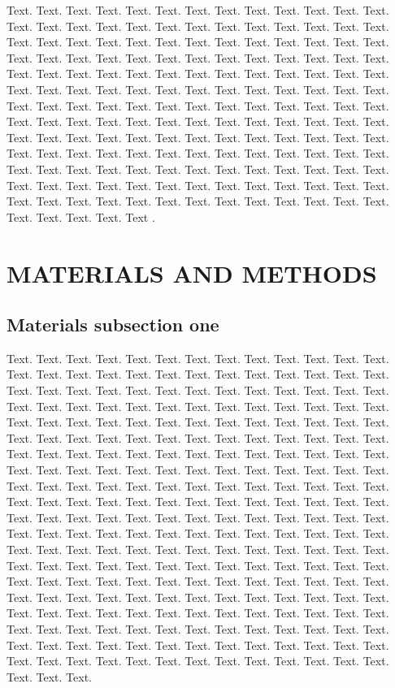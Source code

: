 \documentclass[a4,center,fleqn]{NAR}
\begin{document}
Text. Text. Text. Text. Text. Text. Text. Text. Text. Text. Text.
Text. Text. Text. Text. Text. Text. Text. Text. Text. Text. Text.
Text. Text. Text. Text. Text. Text. Text. Text. Text. Text. Text.
Text. Text. Text. Text. Text. Text. Text. Text. Text. Text. Text.
Text. Text. Text. Text. Text. Text. Text. Text. Text. Text. Text.
Text. Text. Text. Text. Text. Text. Text. Text. Text. Text. Text.
Text. Text. Text. Text. Text. Text. Text. Text. Text. Text. Text.
Text. Text. Text. Text. Text. Text. Text. Text. Text. Text. Text.
Text. Text. Text. Text. Text. Text. Text. Text. Text. Text. Text.
Text. Text. Text. Text. Text. Text. Text. Text. Text. Text. Text.
Text. Text. Text. Text. Text. Text. Text. Text. Text. Text. Text.
Text. Text. Text. Text. Text. Text. Text. Text. Text. Text. Text.
Text. Text. Text. Text. Text. Text. Text. Text. Text. Text. Text.
Text. Text. Text. Text. Text. Text. Text. Text. Text. Text. Text.
Text. Text. Text. Text. Text. Text. Text. Text. Text. Text. Text.
Text. Text. Text. Text. Text. Text. Text. Text.
Text \cite{4}.


\section{MATERIALS AND METHODS}

\subsection{Materials subsection one}

Text. Text. Text. Text. Text. Text. Text. Text. Text. Text. Text.
Text. Text. Text. Text. Text. Text. Text. Text. Text. Text. Text.
Text. Text. Text. Text. Text. Text. Text. Text. Text. Text. Text.
Text. Text. Text. Text. Text. Text. Text. Text. Text. Text. Text.
Text. Text. Text. Text. Text. Text. Text. Text. Text. Text. Text.
Text. Text. Text. Text. Text. Text. Text. Text. Text. Text. Text.
Text. Text. Text. Text. Text. Text. Text. Text. Text. Text. Text.
Text. Text. Text. Text. Text. Text. Text. Text. Text. Text. Text.
Text. Text. Text. Text. Text. Text. Text. Text. Text. Text. Text.
Text. Text. Text. Text. Text. Text. Text. Text. Text. Text. Text.
Text. Text. Text. Text. Text. Text. Text. Text. Text. Text. Text.
Text. Text. Text. Text. Text. Text. Text. Text. Text. Text. Text.
Text. Text. Text. Text. Text. Text. Text. Text. Text. Text. Text.
Text. Text. Text. Text. Text. Text. Text. Text. Text. Text. Text.
Text. Text. Text. Text. Text. Text. Text. Text. Text. Text. Text.
Text. Text. Text. Text. Text. Text. Text. Text. Text. Text. Text.
Text. Text. Text. Text. Text. Text. Text. Text. Text. Text. Text.
Text. Text. Text. Text. Text. Text. Text. Text. Text. Text. Text.
Text. Text. Text. Text. Text. Text. Text. Text. Text. Text. Text.
Text. Text. Text. Text. Text. Text. Text. Text. Text. Text. Text.
Text. Text. Text. Text. Text. Text. Text. Text. Text. Text. Text.
Text. Text. Text. Text. Text. Text. Text. Text. Text. Text. Text.
Text. Text. Text. Text. Text. Text. Text. Text. Text. Text. Text.
Text. Text. Text. Text. Text. Text. Text. Text. Text. Text.
\end{document}
